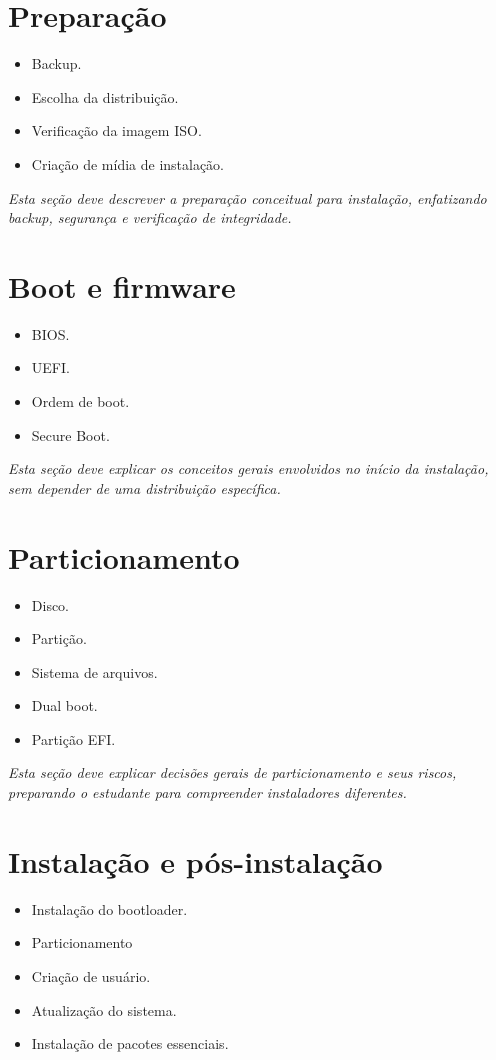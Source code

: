 \documentclass[12pt,openany]{book}
\newcommand{\placeholder}[1]{
    \par\medskip
    \noindent\textit{#1}
    \par\medskip
}
\newcommand{\topicos}[1]{
    \begin{itemize}
        #1
    \end{itemize}
}
\begin{document}
\begin{refsection}
\section{Preparação}

\topicos{
    \item Backup.
    \item Escolha da distribuição.
    \item Verificação da imagem ISO.
    \item Criação de mídia de instalação.
}

\placeholder{Esta seção deve descrever a preparação conceitual para instalação, enfatizando backup, segurança e verificação de integridade.}

\section{Boot e firmware}

\topicos{
    \item BIOS.
    \item UEFI.
    \item Ordem de boot.
    \item Secure Boot.
}

\placeholder{Esta seção deve explicar os conceitos gerais envolvidos no início da instalação, sem depender de uma distribuição específica.}

\section{Particionamento}

\topicos{
    \item Disco.
    \item Partição.
    \item Sistema de arquivos.
    \item Dual boot.
    \item Partição EFI.
}

\placeholder{Esta seção deve explicar decisões gerais de particionamento e seus riscos, preparando o estudante para compreender instaladores diferentes.}

\section{Instalação e pós-instalação}

\topicos{
    
    \item Instalação do bootloader.
    \item Particionamento
    \item Criação de usuário.
    \item Atualização do sistema.
    \item Instalação de pacotes essenciais.
}


\end{refsection}
\end{document}
